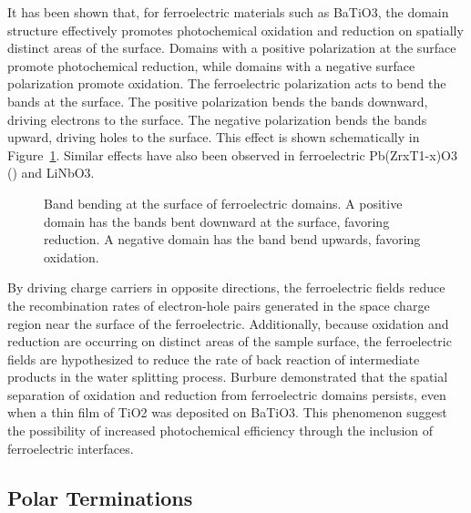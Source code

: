 \documentclass[12pt,%
              twoside,
               letterpaper]{uiothesis}
\begin{document}
It has been shown that, for ferroelectric materials such as BaTiO3, the domain
structure effectively promotes photochemical oxidation and reduction on spatially distinct
areas of the surface.
\cite{Giocondi:2001gz,Burbure:2010go,Giocondi:2003ub,Giocondi:2001bi} Domains with a
positive polarization at the surface promote photochemical reduction, while domains with a
negative surface polarization promote oxidation. The ferroelectric polarization acts to
bend the bands at the surface. The positive polarization bends the bands downward, driving
electrons to the surface. The negative polarization bends the bands upward, driving holes
to the surface. This effect is shown schematically in Figure~\ref{fig:ferroelectric}. Similar
effects have also been observed in ferroelectric Pb(ZrxT1-x)O3 () and
LiNbO3.\cite{Hanson:2006bq,Kalinin:2002iw,Tiwari:2009jv}

\begin{figure}
	\caption[Band bending at the surface of ferroelectric domains]{%
		Band bending at the surface of ferroelectric domains. A positive 
		domain has the bands bent downward at the surface, favoring 
		reduction. A negative domain has the band bend upwards, favoring 
		oxidation.}
	\label{fig:ferroelectric}
\end{figure}

By driving charge carriers in opposite directions, the ferroelectric fields reduce the
recombination rates of electron-hole pairs generated in the space charge region near the
surface of the ferroelectric. Additionally, because oxidation and reduction are occurring
on distinct areas of the sample surface, the ferroelectric fields are hypothesized to
reduce the rate of back reaction of intermediate products in the water splitting process.
Burbure\cite{Burbure:2010go,Burbure:2006cq,Burbure:2010ti} demonstrated that the spatial
separation of oxidation and reduction from ferroelectric domains persists, even when a
thin film of TiO2 was deposited on BaTiO3. This phenomenon suggest the
possibility of increased photochemical efficiency through the inclusion of ferroelectric
interfaces.


\subsection{Polar Terminations}
\label{subsec:background.polarterms}
\end{document}
